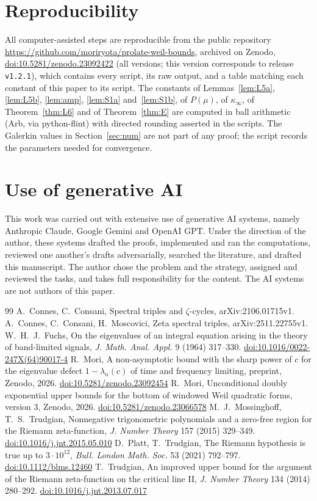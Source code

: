 \documentclass[11pt]{amsart}
\newcommand{\doi}[1]{\href{https://doi.org/#1}{doi:#1}}
\theoremstyle{remark}
\numberwithin{equation}{section}
\begin{document}
\section*{Reproducibility}
All computer-assisted steps are reproducible from the public repository \url{https://github.com/moriryota/prolate-weil-bounds}, archived on Zenodo, \doi{10.5281/zenodo.23092422} (all versions; this version corresponds to release \texttt{v1.2.1}), which contains every script, its raw output, and a table matching each constant of this paper to its script. The constants of Lemmas~\ref{lem:L5a}, \ref{lem:L5b}, \ref{lem:amp}, \ref{lem:S1a} and~\ref{lem:S1b}, of $P(\mu)$, of $\kappa_\infty$, of Theorem~\ref{thm:L6} and of Theorem~\ref{thm:E} are computed in ball arithmetic (Arb, via python-flint) with directed rounding asserted in the scripts. The Galerkin values in Section~\ref{sec:num} are not part of any proof; the script records the parameters needed for convergence.

\section*{Use of generative AI}
This work was carried out with extensive use of generative AI systems, namely Anthropic Claude, Google Gemini and OpenAI GPT. Under the direction of the author, these systems drafted the proofs, implemented and ran the computations, reviewed one another's drafts adversarially, searched the literature, and drafted this manuscript. The author chose the problem and the strategy, assigned and reviewed the tasks, and takes full responsibility for the content. The AI systems are not authors of this paper.

\begin{thebibliography}{99}
 A.~Connes, C.~Consani, Spectral triples and $\zeta$-cycles, arXiv:2106.01715v1.
 A.~Connes, C.~Consani, H.~Moscovici, Zeta spectral triples, arXiv:2511.22755v1.
 W.~H.~J.~Fuchs, On the eigenvalues of an integral equation arising in the theory of band-limited signals, \emph{J. Math. Anal. Appl.} 9 (1964) 317--330. \doi{10.1016/0022-247X(64)90017-4}
 R.~Mori, A non-asymptotic bound with the sharp power of $c$ for the eigenvalue defect $1-\lambda_n(c)$ of time and frequency limiting, preprint, Zenodo, 2026. \doi{10.5281/zenodo.23092454}
 R.~Mori, Unconditional doubly exponential upper bounds for the bottom of windowed Weil quadratic forms, version 3, Zenodo, 2026. \doi{10.5281/zenodo.23066578}
 M.~J.~Mossinghoff, T.~S.~Trudgian, Nonnegative trigonometric polynomials and a zero-free region for the Riemann zeta-function, \emph{J. Number Theory} 157 (2015) 329--349. \doi{10.1016/j.jnt.2015.05.010}
 D.~Platt, T.~Trudgian, The Riemann hypothesis is true up to $3\cdot10^{12}$, \emph{Bull. London Math. Soc.} 53 (2021) 792--797. \doi{10.1112/blms.12460}
 T.~Trudgian, An improved upper bound for the argument of the Riemann zeta-function on the critical line II, \emph{J. Number Theory} 134 (2014) 280--292. \doi{10.1016/j.jnt.2013.07.017}
\end{thebibliography}
\end{document}
